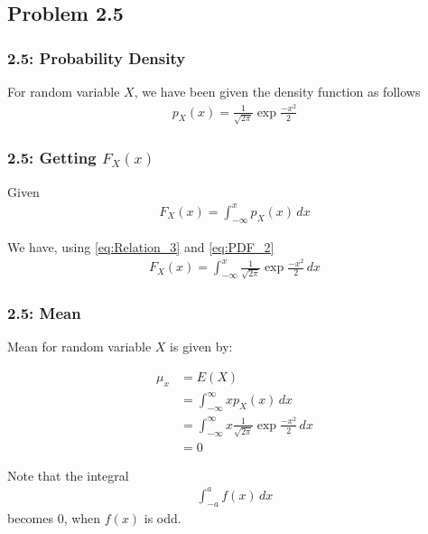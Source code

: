 \documentclass{beamer}
\begin{document}
\subsection{Problem 2.5}

\begin{frame}
	\frametitle{2.5: Probability Density}
	For random variable $X$, we have been given the density function as follows
	\begin{align}
		p_X(x) = \frac{1}{\sqrt{2\pi}}\exp{\frac{-x^2}{2}} 
		\label{eq:PDF_2}
	\end{align}
\end{frame}

\begin{frame}
	\frametitle{2.5: Getting $F_X(x)$}

	Given
	\begin{align}
		F_X(x) = \int_{-\infty}^{x} p_X(x) \,dx
		\label{eq:Relation_3}
	\end{align}

	We have, using 
	\eqref{eq:Relation_3} and 
	\eqref{eq:PDF_2}
	\begin{align}
		F_X(x) = \int_{-\infty}^{x} \frac{1}{\sqrt{2\pi}}\exp{\frac{-x^2}{2}} \,dx
	\end{align}

\end{frame}

\begin{frame}
	\frametitle{2.5: Mean}
	Mean for random variable $X$ is given by:
	
	\begin{align}
		\mu_x &= E(X) \\
		&= \int^{\infty}_{-\infty} x p_X(x) \,dx \\
		&= \int^{\infty}_{-\infty} x \frac{1}{\sqrt{2\pi}}\exp{\frac{-x^2}{2}} \,dx \\
		&= 0
	\end{align}

	Note that the integral
	\begin{align}
		\int^a_{-a} f(x) \,dx
	\end{align}
	becomes 0, when $f(x)$ is odd.

\end{frame}
\end{document}
